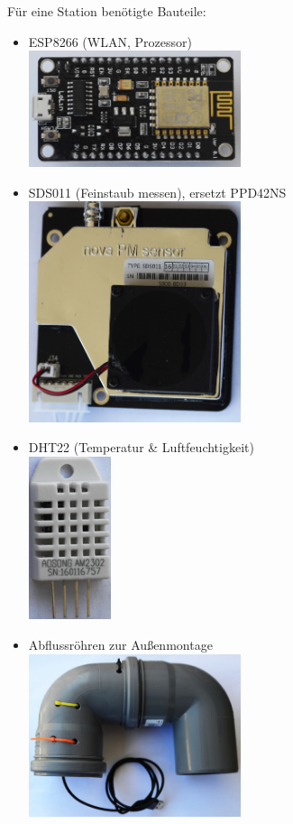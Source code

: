 \documentclass[
notumble,
]{leaflet}
\begin{document}
Für eine Station benötigte Bauteile:
\begin{itemize}
\item ESP8266 (WLAN, Prozessor) \\\includegraphics[width=0.49\textwidth]{images/sensor/esp8266.jpg} 
\item SDS011 (Feinstaub messen), ersetzt PPD42NS \\\includegraphics[width=0.49\textwidth]{images/sensor/sds011.jpg} 
\item DHT22 (Temperatur \& Luftfeuchtigkeit)\\\includegraphics[width=0.19\textwidth,angle=90]{images/sensor/dht22.jpg}
\item Abflussröhren zur Außenmontage \\\includegraphics[width=0.49\textwidth]{images/sensor/roehren.jpg} 

\end{itemize}
\end{document}

